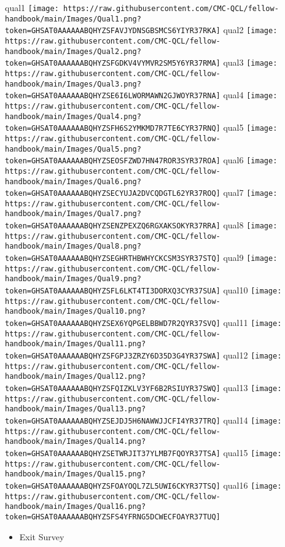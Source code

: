 \documentclass[
]{book}
\providecommand{\tightlist}{%
  \setlength{\itemsep}{0pt}\setlength{\parskip}{0pt}}
\begin{document}
qual1
\texttt{[image: https://raw.githubusercontent.com/CMC-QCL/fellow-handbook/main/Images/Qual1.png?token=GHSAT0AAAAAABQHYZSFAVJYDNSGBSMCS6YIYR37RKA]}
qual2
\texttt{[image: https://raw.githubusercontent.com/CMC-QCL/fellow-handbook/main/Images/Qual2.png?token=GHSAT0AAAAAABQHYZSFGDKV4VYMVR2SM5Y6YR37RMA]}
qual3
\texttt{[image: https://raw.githubusercontent.com/CMC-QCL/fellow-handbook/main/Images/Qual3.png?token=GHSAT0AAAAAABQHYZSE6I6LWORMAWN2GJWOYR37RNA]}
qual4
\texttt{[image: https://raw.githubusercontent.com/CMC-QCL/fellow-handbook/main/Images/Qual4.png?token=GHSAT0AAAAAABQHYZSFH6S2YMKMD7R7TE6CYR37RNQ]}
qual5
\texttt{[image: https://raw.githubusercontent.com/CMC-QCL/fellow-handbook/main/Images/Qual5.png?token=GHSAT0AAAAAABQHYZSEOSFZWD7HN47ROR3SYR37ROA]}
qual6
\texttt{[image: https://raw.githubusercontent.com/CMC-QCL/fellow-handbook/main/Images/Qual6.png?token=GHSAT0AAAAAABQHYZSECYUJA2DVCQDGTL62YR37ROQ]}
qual7
\texttt{[image: https://raw.githubusercontent.com/CMC-QCL/fellow-handbook/main/Images/Qual7.png?token=GHSAT0AAAAAABQHYZSENZPEXZQ6RGXAKSOKYR37RRA]}
qual8
\texttt{[image: https://raw.githubusercontent.com/CMC-QCL/fellow-handbook/main/Images/Qual8.png?token=GHSAT0AAAAAABQHYZSEGHRTHBWHYCKCSM3SYR37STQ]}
qual9
\texttt{[image: https://raw.githubusercontent.com/CMC-QCL/fellow-handbook/main/Images/Qual9.png?token=GHSAT0AAAAAABQHYZSFL6LKT4TI3DORXQ3CYR37SUA]}
qual10
\texttt{[image: https://raw.githubusercontent.com/CMC-QCL/fellow-handbook/main/Images/Qual10.png?token=GHSAT0AAAAAABQHYZSEX6YQPGELBBWD7R2QYR37SVQ]}
qual11
\texttt{[image: https://raw.githubusercontent.com/CMC-QCL/fellow-handbook/main/Images/Qual11.png?token=GHSAT0AAAAAABQHYZSFGPJ3ZRZY6D35D3G4YR37SWA]}
qual12
\texttt{[image: https://raw.githubusercontent.com/CMC-QCL/fellow-handbook/main/Images/Qual12.png?token=GHSAT0AAAAAABQHYZSFQIZKLV3YF6B2RSIUYR37SWQ]}
qual13
\texttt{[image: https://raw.githubusercontent.com/CMC-QCL/fellow-handbook/main/Images/Qual13.png?token=GHSAT0AAAAAABQHYZSEJDJ5H6NAWWJJCFI4YR37TRQ]}
qual14
\texttt{[image: https://raw.githubusercontent.com/CMC-QCL/fellow-handbook/main/Images/Qual14.png?token=GHSAT0AAAAAABQHYZSETWRJIT37YLMB7FQOYR37TSA]}
qual15
\texttt{[image: https://raw.githubusercontent.com/CMC-QCL/fellow-handbook/main/Images/Qual15.png?token=GHSAT0AAAAAABQHYZSFOAYOQL7ZL5UWI6CKYR37TSQ]}
qual16
\texttt{[image: https://raw.githubusercontent.com/CMC-QCL/fellow-handbook/main/Images/Qual16.png?token=GHSAT0AAAAAABQHYZSFS4YFRNG5DCWECFOAYR37TUQ]}

\begin{itemize}
\tightlist
\item
  Exit Survey
\end{itemize}
\end{document}
